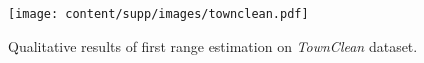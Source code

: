 \begin{figure}[t]
\centering
\texttt{[image: content/supp/images/townclean.pdf]}

\caption{Qualitative results of first range estimation on \textit{TownClean} dataset.}
\label{fig:supp_townclean}

\end{figure}